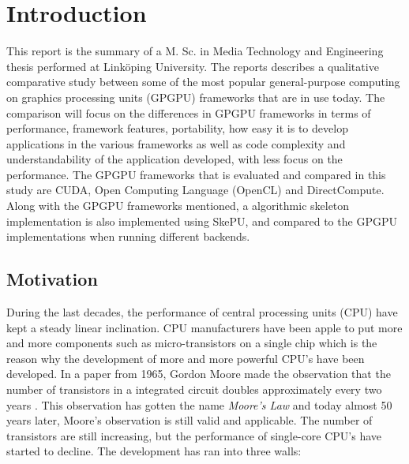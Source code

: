 
\chapter{Introduction}  %
This report is the summary of a M. Sc. in Media Technology and Engineering thesis performed at Linköping University. The reports describes a qualitative comparative study between some of the most popular general-purpose computing on graphics processing units (GPGPU) frameworks that are in use today. The comparison will focus on the differences in GPGPU frameworks in terms of performance, framework features, portability, how easy it is to develop applications in the various frameworks as well as code complexity and understandability of the application developed, with less focus on the performance. The GPGPU frameworks that is evaluated and compared in this study are CUDA, Open Computing Language (OpenCL) and DirectCompute. Along with the GPGPU frameworks mentioned, a algorithmic skeleton implementation is also implemented using SkePU, and compared to the GPGPU implementations when running different backends.


\section{Motivation} \label{sec:IntroductionMotivation}
During the last decades, the performance of central processing units (CPU) have kept a steady linear inclination. CPU manufacturers have been apple to put more and more components such as micro-transistors on a single chip which is the reason why the development of more and more powerful CPU's have been developed. In a paper from 1965, Gordon Moore made the observation that the number of transistors in a integrated circuit doubles approximately every two years \cite{MooresLaw}. This observation has gotten the name \textit{Moore's Law} and today almost 50 years later, Moore's observation is still valid and applicable. The number of transistors are still increasing, but the performance of single-core CPU's have started to decline. The development has ran into three walls:

